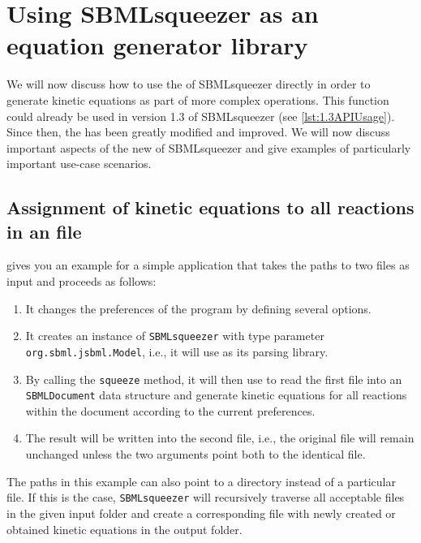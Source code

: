 \section{Using SBMLsqueezer as an equation generator library}
\label{sec:API}

We will now discuss how to use the \API of SBMLsqueezer directly in order to generate kinetic equations as part of more complex operations.
This function could already be used in version 1.3 of SBMLsqueezer (see \vref{lst:1.3APIUsage}).
Since then, the \API has been greatly modified and improved.
We will now discuss important aspects of the new \API of SBMLsqueezer and give examples of particularly important use-case scenarios.

\subsection{Assignment of kinetic equations to all reactions in an \SBML file}

 gives you an example for a simple application that takes the paths to two \SBML files as input and proceeds as follows:
\begin{enumerate}
  \item It changes the preferences of the program by defining several options.
  \item It creates an instance of \texttt{SBMLsqueezer} with type parameter \texttt{org.sbml.jsbml.Model}, i.e., it will use \JSBML as its parsing library.
  \item By calling the \texttt{squeeze} method, it will then use \JSBML to read the first file into an \texttt{SBMLDocument} data structure and generate kinetic equations for all reactions within the document according to the current preferences.
  \item The result will be written into the second file, i.e., the original file will remain unchanged unless the two arguments point both to the identical file.
\end{enumerate}
The paths in this example can also point to a directory instead of a particular file.
If this is the case, \texttt{SBMLsqueezer} will recursively traverse all acceptable \SBML files in the given input folder and create a corresponding file with newly created or obtained kinetic equations in the output folder.


